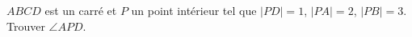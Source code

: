 $ABCD$ est un carré et $P$ un point intérieur tel que $|PD| = 1$, $|PA| = 2$, $|PB| = 3$. Trouver $\angle APD$.
